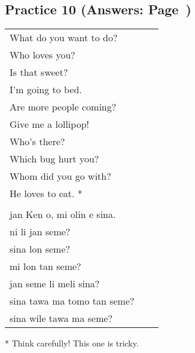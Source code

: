 \subsection*{Practice 10 (Answers: Page~\pageref{'questions_using_seme'})}
%
\begin{supertabular}{p{5,5cm}|ll}
   What do you want to do? &&   \\ %
   Who loves you? &&   \\ %
   Is that sweet?  &&  \\ %
   I'm going to bed. && \\  %
   Are more people coming? &&  \\  %
   Give me a lollipop! && \\   %
   Who's there? &&   \\ %
   Which bug hurt you?  &&  \\ %
   Whom did you go with? &&  \\  %
   He loves to eat. * &&  \\ %
 && \\ %
   jan Ken o, mi olin e sina.  && \\  %
   ni li jan seme?  && \\  %
   sina lon seme?   && \\  %
   mi lon tan seme?  && \\  %
   jan seme li meli sina?   && \\    %
   sina tawa ma tomo tan seme?    && \\   %
   sina wile tawa ma seme?      && \\  %
\end{supertabular} 

* Think carefully! This one is tricky. 
